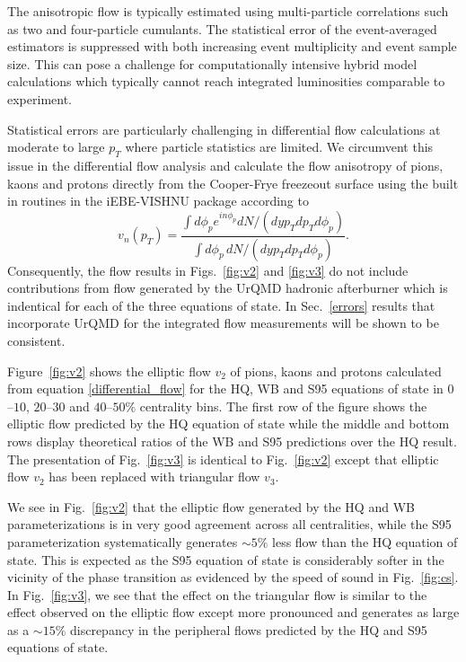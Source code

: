 \documentclass[aps,prc,reprint,amsmath,nofootinbib,superscriptaddress]{revtex4-1}
\begin{document}
The anisotropic flow is typically estimated using multi-particle correlations such as two and four-particle cumulants. The statistical error of the event-averaged estimators is suppressed with both increasing event multiplicity and event sample size. This can pose a challenge for computationally intensive hybrid model calculations which typically cannot reach integrated luminosities comparable to experiment. 

Statistical errors are particularly challenging in differential flow calculations at moderate to large $p_T$ where particle statistics are limited. We circumvent this issue in the differential flow analysis and calculate the flow anisotropy of pions, kaons and protons directly from the Cooper-Frye freezeout surface using the built in routines in the iEBE-VISHNU package according to
\begin{equation}
 \label{differential_flow}
 v_n(p_T) = \frac{\int d\phi_p e^{i n \phi_p} dN/(dy p_T dp_T d\phi_p)}{\int d\phi_p\, dN/(dy p_T dp_T d\phi_p)}.
\end{equation}
Consequently, the flow results in Figs.~\ref{fig:v2} and \ref{fig:v3} do not include contributions from flow generated by the UrQMD hadronic afterburner which is indentical for each of the three equations of state.  In Sec.~\ref{errors} results that incorporate UrQMD for the integrated flow measurements will be shown to be consistent.

Figure~\ref{fig:v2} shows the elliptic flow $v_2$ of pions, kaons and protons calculated from equation \eqref{differential_flow} for the HQ, WB and S95 equations of state in $0$--$10$, $20$--$30$ and $40$--$50\%$ centrality bins. 
The first row of the figure shows the elliptic flow predicted by the HQ equation of state while the middle and bottom rows display theoretical ratios of the WB and S95 predictions over the HQ result. The presentation
of Fig.~\ref{fig:v3} is identical to Fig.~\ref{fig:v2} except that elliptic flow $v_2$ has been replaced with triangular flow $v_3$.

We see in Fig.~\ref{fig:v2} that the elliptic flow generated by the HQ and WB parameterizations is in very good agreement across all centralities, while the S95 parameterization systematically generates $\sim \! 5\%$ less flow than the HQ equation of state. This is expected as the S95 equation of state is considerably softer in the vicinity of the phase transition as evidenced by the speed of sound in Fig.~\ref{fig:cs}.  In Fig.~\ref{fig:v3}, we see that the effect on the triangular flow is similar to the effect observed on the elliptic flow except more pronounced and generates as large as a $\sim \! 15\%$ discrepancy in the peripheral flows predicted by the HQ and S95 equations of state. 
\end{document}
